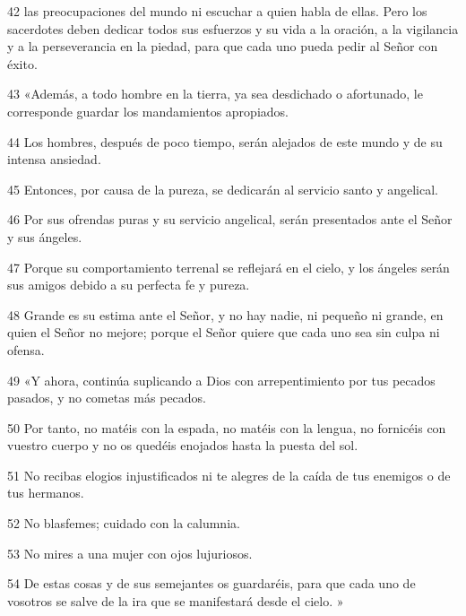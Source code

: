 \par 42 las preocupaciones del mundo ni escuchar a quien habla de ellas. Pero los sacerdotes deben dedicar todos sus esfuerzos y su vida a la oración, a la vigilancia y a la perseverancia en la piedad, para que cada uno pueda pedir al Señor con éxito.

\par 43 «Además, a todo hombre en la tierra, ya sea desdichado o afortunado, le corresponde guardar los mandamientos apropiados.

\par 44 Los hombres, después de poco tiempo, serán alejados de este mundo y de su intensa ansiedad.

\par 45 Entonces, por causa de la pureza, se dedicarán al servicio santo y angelical.

\par 46 Por sus ofrendas puras y su servicio angelical, serán presentados ante el Señor y sus ángeles.

\par 47 Porque su comportamiento terrenal se reflejará en el cielo, y los ángeles serán sus amigos debido a su perfecta fe y pureza.

\par 48 Grande es su estima ante el Señor, y no hay nadie, ni pequeño ni grande, en quien el Señor no mejore; porque el Señor quiere que cada uno sea sin culpa ni ofensa.

\par 49 «Y ahora, continúa suplicando a Dios con arrepentimiento por tus pecados pasados, y no cometas más pecados.

\par 50 Por tanto, no matéis con la espada, no matéis con la lengua, no fornicéis con vuestro cuerpo y no os quedéis enojados hasta la puesta del sol.

\par 51 No recibas elogios injustificados ni te alegres de la caída de tus enemigos o de tus hermanos.

\par 52 No blasfemes; cuidado con la calumnia.

\par 53 No mires a una mujer con ojos lujuriosos.

\par 54 De estas cosas y de sus semejantes os guardaréis, para que cada uno de vosotros se salve de la ira que se manifestará desde el cielo. »

